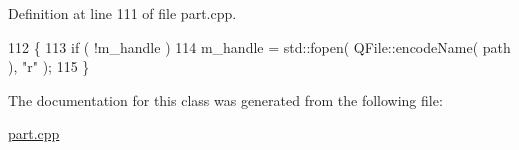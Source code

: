 Definition at line 111 of file part.\+cpp.


\begin{DoxyCode}
112         \{
113             \textcolor{keywordflow}{if} ( !m\_handle )
114                 m\_handle = std::fopen( QFile::encodeName( path ), \textcolor{stringliteral}{"r"} );
115         \}
\end{DoxyCode}


The documentation for this class was generated from the following file\+:\begin{DoxyCompactItemize}
\item 
\hyperlink{part_8cpp}{part.\+cpp}\end{DoxyCompactItemize}
